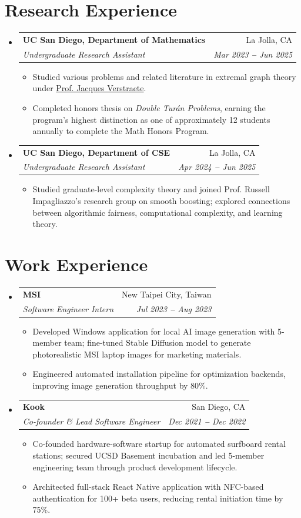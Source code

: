 \documentclass[letterpaper,11pt]{article}
\makeatletter
\newcommand{\resumeItem}[1]{
  \item\small{
    {#1 \vspace{-1pt}}
  }
}
\newcommand{\resumeSubheading}[4]{
  \vspace{-2pt}\item
    \begin{tabular*}{0.97\textwidth}[t]{l@{\extracolsep{\fill}}r}
      \textbf{#1} & #2 \\
      \textit{\small#3} & \textit{\small #4} \\
    \end{tabular*}\vspace{-2pt}
}
\newcommand{\resumeSubHeadingListStart}{\begin{itemize}[leftmargin=0.15in, label={}]}
\newcommand{\resumeSubHeadingListEnd}{\end{itemize}}
\newcommand{\resumeItemListStart}{\begin{itemize}\vspace{-2pt}}
\newcommand{\resumeItemListEnd}{\end{itemize}\vspace{-7pt}}
\makeatother
\begin{document}

\section{Research Experience}
\resumeSubHeadingListStart
  \resumeSubheading
    {UC San Diego, Department of Mathematics}{La Jolla, CA}
    {Undergraduate Research Assistant}{Mar 2023 \textbf{--} Jun 2025}
    \resumeItemListStart
      \resumeItem{Studied various problems and related literature in extremal graph theory under \href{https://annatar0.wixsite.com/website-4}{Prof. Jacques Verstraete}.}
      \resumeItem{Completed honors thesis on \textit{Double Tur\'{a}n Problems}, earning the program's highest distinction as one of approximately 12 students annually to complete the Math Honors Program.}
    \resumeItemListEnd

  \resumeSubheading
    {UC San Diego, Department of CSE}{La Jolla, CA}
    {Undergraduate Research Assistant}{Apr 2024 \textbf{--} Jun 2025}
    \resumeItemListStart
      \resumeItem{Studied graduate-level complexity theory and joined Prof. Russell Impagliazzo's research group on smooth boosting; explored connections between algorithmic fairness, computational complexity, and learning theory.}
    \resumeItemListEnd
\resumeSubHeadingListEnd


\section{Work Experience}
\resumeSubHeadingListStart
  \resumeSubheading
    {MSI}{New Taipei City, Taiwan}
    {Software Engineer Intern}{Jul 2023 \textbf{--} Aug 2023}
    \resumeItemListStart
      \resumeItem{Developed Windows application for local AI image generation with 5-member team; fine-tuned Stable Diffusion model to generate photorealistic MSI laptop images for marketing materials.}
      \resumeItem{Engineered automated installation pipeline for optimization backends, improving image generation throughput by 80\%.}
    \resumeItemListEnd

  \resumeSubheading
    {Kook}{San Diego, CA}
    {Co-founder \& Lead Software Engineer}{Dec 2021 \textbf{--} Dec 2022}
    \resumeItemListStart
      \resumeItem{Co-founded hardware-software startup for automated surfboard rental stations; secured UCSD Basement incubation and led 5-member engineering team through product development lifecycle.}
      \resumeItem{Architected full-stack React Native application with NFC-based authentication for 100+ beta users, reducing rental initiation time by 75\%.}
    \resumeItemListEnd
\resumeSubHeadingListEnd
\end{document}
